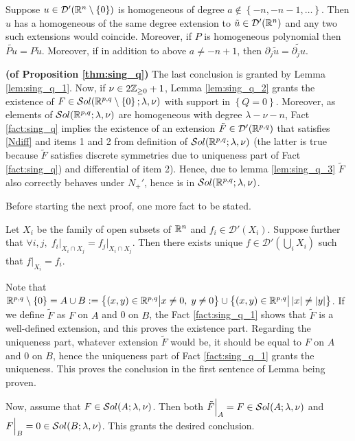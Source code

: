 \documentclass[10pt]{article} %
\newcommand{\D}{\mathcal{D}}
\theoremstyle{definition}
\theoremstyle{remark}
\begin{document}
\begin{myfact}{\bf\cite[thm 3.2.3]{hormander1983analysis}}\newline
	Suppose $u\in\D'(\R^n\setminus\left\{ 0 \right\})$ is homogeneous of degree $a\notin\left\{ -n,-n-1,\dots \right\}$.
	Then $u$ has a homogeneous of the same degree extension to $\tilde{u}\in\D'(\R^n)$ and any two such extensions would coincide.
	Moreover, if $P$ is homogeneous polynomial then $\tilde{Pu}=P\tilde{u}$. Moreover, if in addition to above $a\neq -n+1$,
	then $\partial_j\tilde{u}=\tilde{\partial_ju}$.
	\label{fact:sing_q}
\end{myfact}
\begin{myproof}{\bf (of Proposition \ref{thm:sing_q})}\newline
	The last conclusion is granted by Lemma \ref{lem:sing_q_1}. Now, if $\nu\in2\Z_{\geq0}+1$, Lemma \ref{lem:sing_q_2}
	grants the existence of $F\in\sol[\R^{p,q}\setminus\left\{ 0 \right\}]$ with support in $\left\{ Q=0 \right\}$.
	Moreover, as elements of $\sol$ are homogeneous with degree $\lambda-\nu-n$, Fact 
	\ref{fact:sing_q}
	implies the existence of an extension $\tilde{F}\in\D'(\R^{p,q})$ that satisfies \eqref{Ndiff} and items 1 and 2
	from definition of $\sol$ (the latter is true because $\tilde{F}$ satisfies
	discrete symmetries due to uniqueness part of Fact \ref{fact:sing_q}) and differential of item 2).
	Hence, due to lemma \ref{lem:sing_q_3} $\tilde{F}$ also correctly behaves under $N_+'$, hence is in $\sol$.
\end{myproof}
Before starting the next proof, one more fact to be stated.
\begin{myfact}
	Let $X_i$ be the family of open subsets of $\R^n$ and $f_i\in\D'(X_i)$. Suppose further
	that $\forall i,j,\;f_i\Big|_{X_i\cap X_j}=f_j\Big|_{X_i\cap X_j}$. Then there exists unique
	$f\in\D'(\bigcup_iX_i)$ such that $f\Big|_{X_i}=f_i$.
	\label{fact:sing_q_1}
\end{myfact}
\begin{myproof}
	Note that $\R^{p,q}\setminus\left\{ 0 \right\}=A\cup B:
	=\mysetn{(x,y)\in\R^{p,q}}{x\neq0,\;y\neq0}\cup\mysetn{(x,y)\in\R^{p,q}}
	{\myabs{x}\neq\myabs{y}}$. If we define $\tilde{F}$ as $F$ on $A$ and 0 on $B$, the Fact \ref{fact:sing_q_1}
	shows that $\tilde{F}$ is a well-defined extension, and this proves the existence part. Regarding the uniqueness part,
	whatever extension $\tilde{F}$ would be, it should be equal to $F$ on $A$ and 0 on $B$, hence the uniqueness part 
	of Fact \ref{fact:sing_q_1} grants the uniqueness. This proves the conclusion in the first sentence of Lemma being proven.

	Now, assume that $F\in\sol[A]$. Then both $\tilde{F}\Big|_A=F\in\sol[A]$ and
	$F\Big|_B=0\in\sol[B]$. This grants the desired conclusion.
\end{myproof}
\end{document}
